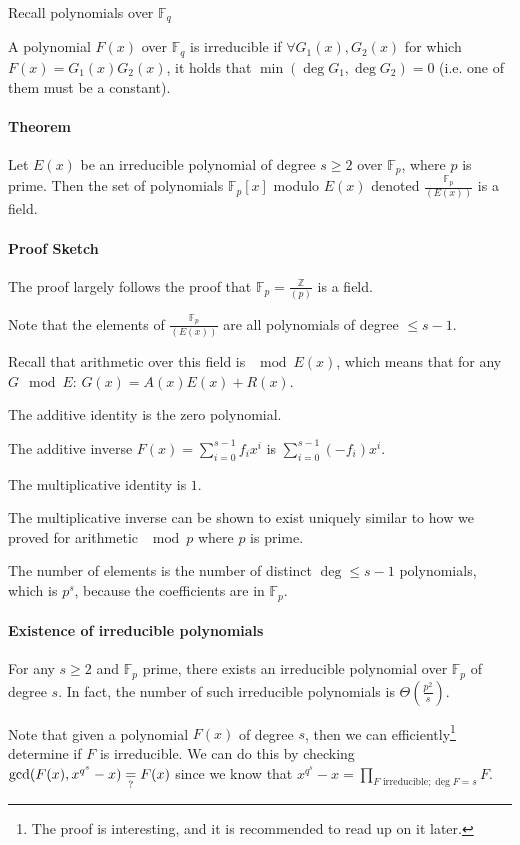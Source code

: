 \documentclass{idc_msc}
\newcommand{\Fq}[1][q]{{\mathbb{F}_{#1}}}
\begin{document}
Recall polynomials over \(\Fq\)

A polynomial \(F(x)\) over \(\Fq\) is irreducible if \(\forall G_1(x), G_2(x)\) for which \(F(x) = G_1(x)G_2(x)\), it holds that \(\min(\deg G_1, \deg G_2) = 0\) (i.e. one of them must be a constant).

\paragraph{Theorem}

Let \(E(x)\) be an irreducible polynomial of degree \(s \ge 2\) over \(\Fq[p]\), where \(p\) is prime.
Then the set of polynomials \(\Fq[p][x]\) modulo \(E(x)\) denoted \(\frac{\Fq[p]}{(E(x))}\) is a field.

\paragraph{Proof Sketch}

The proof largely follows the proof that \(\Fq[p] = \frac{\mathbb{Z}}{(p)}\) is a field.

Note that the elements of \(\frac{\Fq[p]}{(E(x))}\) are all polynomials of degree \(\le s - 1\).

Recall that arithmetic over this field is \(\mod E(x)\), which means that for any \(G \mod E\):
\(G(x) = A(x)E(x) + R(x)\).

The additive identity is the zero polynomial.

The additive inverse \(F(x) = \sum_{i=0}^{s-1} f_i x^i\) is \(\sum_{i=0}^{s-1} (-f_i) x^i\).

The multiplicative identity is \(1\).

The multiplicative inverse can be shown to exist uniquely similar to how we proved for arithmetic \(\mod p\) where \(p\) is prime.

The number of elements is the number of distinct \(\deg \le s-1\) polynomials, which is \(p^s\), because the coefficients are in \(\Fq[p]\).

\paragraph{Existence of irreducible polynomials}

For any \(s \ge 2\) and \(\Fq[p]\) prime, there exists an irreducible polynomial over \(\Fq[p]\) of degree \(s\).
In fact, the number of such irreducible polynomials is \(\Theta\left(\frac{p^2}{s}\right)\).

Note that given a polynomial \(F(x)\) of degree \(s\), then we can efficiently\footnote{The proof is interesting, and it is recommended to read up on it later.} determine if \(F\) is irreducible.
We can do this by checking \(\gcd(F(x), x^{q^s}-x) \underrel{?}{=} F(x)\) since we know that \(x^{q^s}-x = \prod_{F\text{ irreducible}; \deg F = s} F\).
\end{document}
